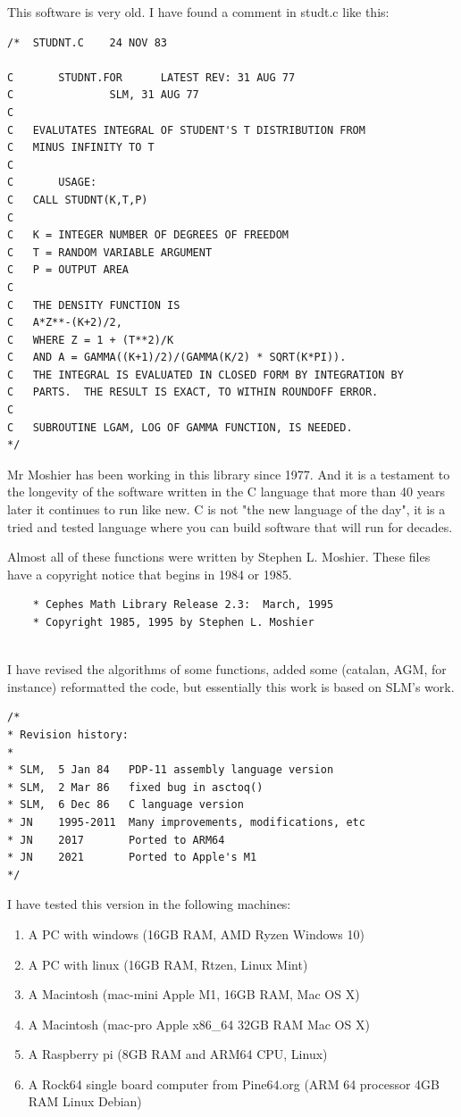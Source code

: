 \documentclass[10pt,a4paper,x11names]{memoir} %
\begin{document}
This software is very old. I have found a comment in studt.c like this:
\begin{verbatim}
/*  STUDNT.C    24 NOV 83

C       STUDNT.FOR      LATEST REV: 31 AUG 77
C               SLM, 31 AUG 77
C
C   EVALUTATES INTEGRAL OF STUDENT'S T DISTRIBUTION FROM
C   MINUS INFINITY TO T
C
C       USAGE:
C   CALL STUDNT(K,T,P)
C
C   K = INTEGER NUMBER OF DEGREES OF FREEDOM
C   T = RANDOM VARIABLE ARGUMENT
C   P = OUTPUT AREA
C
C   THE DENSITY FUNCTION IS
C   A*Z**-(K+2)/2,
C   WHERE Z = 1 + (T**2)/K
C   AND A = GAMMA((K+1)/2)/(GAMMA(K/2) * SQRT(K*PI)).
C   THE INTEGRAL IS EVALUATED IN CLOSED FORM BY INTEGRATION BY
C   PARTS.  THE RESULT IS EXACT, TO WITHIN ROUNDOFF ERROR.
C
C   SUBROUTINE LGAM, LOG OF GAMMA FUNCTION, IS NEEDED.
*/

\end{verbatim}
Mr Moshier has been working in this library since 1977. And it is a testament to the longevity of the 
software written in the C language that more than 40 years later it continues to run like new. C is not "the new language of the day", it
is a tried and tested language where you can build software that will run for decades.

Almost all of these functions were written by Stephen L. Moshier. These files have a copyright notice that begins in 1984 or 1985.
\begin{verbatim}
	* Cephes Math Library Release 2.3:  March, 1995
	* Copyright 1985, 1995 by Stephen L. Moshier
	
\end{verbatim}
I have revised the algorithms of some functions, added some (catalan, AGM, for instance) reformatted the code, but essentially this work is based on SLM's work.
\begin{verbatim}
/*
* Revision history:
*
* SLM,  5 Jan 84   PDP-11 assembly language version
* SLM,  2 Mar 86   fixed bug in asctoq()
* SLM,  6 Dec 86   C language version
* JN    1995-2011  Many improvements, modifications, etc
* JN    2017       Ported to ARM64
* JN    2021       Ported to Apple's M1
*/
\end{verbatim}
I have tested this version in the following machines:
\begin{enumerate}
\item A PC with windows (16GB RAM, AMD Ryzen Windows 10) 
\item A PC with linux (16GB RAM, Rtzen, Linux Mint)
\item  A Macintosh (mac-mini Apple M1, 16GB RAM, Mac OS X)
\item A Macintosh (mac-pro Apple x86\_64 32GB RAM Mac OS X)
\item  A Raspberry pi (8GB RAM and ARM64 CPU, Linux)
\item A Rock64 single board computer from Pine64.org (ARM 64 processor 4GB RAM Linux Debian)
\end{enumerate}
\end{document}
